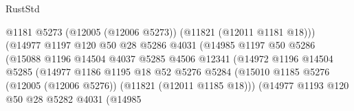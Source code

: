 \begin{lexlean}{RustStd}
\begin{coremodule}
                                            @1181
                                            @5273
                                            (@12005 (@12006 @5273))
                                            (@11821 (@12011 @1181 @18)))
                                          (@14977
                                            @1197
                                            @120
                                            @50
                                            @28
                                            @5286
                                            @4031
                                            (@14985
                                              @1197
                                              @50
                                              @5286
                                              (@15088
                                                @1196
                                                @14504
                                                @4037
                                                @5285
                                                @4506
                                                @12341
                                                (@14972
                                                  @1196
                                                  @14504
                                                  @5285
                                                  (@14977
                                                    @1186
                                                    @1195
                                                    @18
                                                    @52
                                                    @5276
                                                    @5284
                                                    (@15010
                                                      @1185
                                                      @5276
                                                      (@12005 (@12006 @5276))
                                                      (@11821 (@12011 @1185 @18)))
                                                    (@14977
                                                      @1193
                                                      @120
                                                      @50
                                                      @28
                                                      @5282
                                                      @4031
                                                      (@14985

\end{coremodule}
\end{lexlean}
